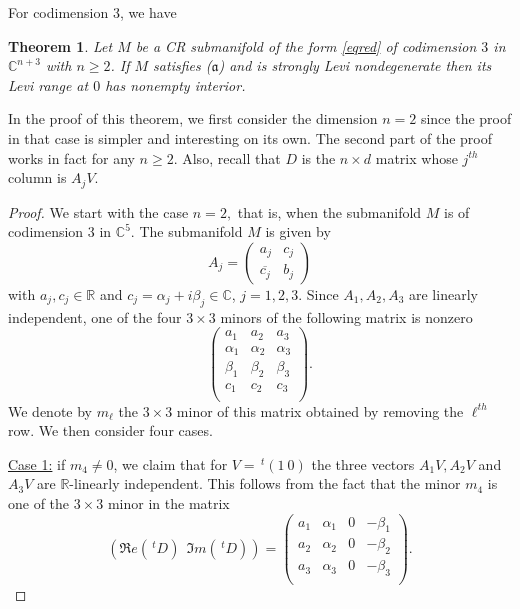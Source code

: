 \documentclass[12pt]{amsart}
\newcommand{\C}{\mathbb C}
\newcommand{\R}{\mathbb R}
\newcommand{\transp}{\,^t}
\newtheorem{theo}{Theorem}[section]
\theoremstyle{remark}
\theoremstyle{example}
\theoremstyle{definition}
\numberwithin{equation}{section}
\begin{document}
For codimension 3, we have  

\begin{theo}\label{theod=3}
Let $M$ be a CR submanifold of the form \eqref{eqred} of codimension $3$ in $\C^{n+3}$ with $n\geq 2$. If $M$ satisfies ($\mathfrak{a}$) and is strongly Levi nondegenerate then its Levi range at $0$ has nonempty interior. 
\end{theo}

In the proof of this theorem, we first consider the dimension  $n=2$ since the proof in that case is simpler and interesting on its own. The second part of the proof works in fact for any $n \geq 2$. Also, recall that $D$ is the $n\times d$ matrix whose $j^{th}$ column is $A_jV$.
    
\begin{proof} 
We start with the case  $n=2,$ that is, when the submanifold  $M$ is of codimension 3 in $\C^5$. The submanifold $M$ is given by 
$$A_j=\begin{pmatrix}a_j & c_j \\ \overline{c_j} & b_j \end{pmatrix}$$
with $a_j,c_j \in \R$ and $c_j=\alpha_j+i\beta_j \in \C$, $j=1,2,3$. Since $A_1,A_2,A_3$ are linearly independent, one of the four $3\times 3$ minors of the following matrix is nonzero
$$\begin{pmatrix}
a_1 & a_2 & a_3 \\ 
\alpha_1 & \alpha_2 & \alpha_3 \\ 
\beta_1 & \beta_2 & \beta_3 \\ 
c_1 & c_2 & c_3 \\ 
 \end{pmatrix}.$$
We denote by $m_\ell$ the $3\times 3$ minor of this matrix obtained by removing the $\ell^{th}$ row. We then consider four cases. 

\noindent \underline{Case 1:} if $m_4\neq 0$, we claim that for $V=\transp (1 \  0)$ the three vectors $A_1V,A_2V$ and $A_3V$ are $\R$-linearly independent. This follows from the fact that the 
minor $m_4$ is one of the $3\times 3$ minor in the matrix 
$$(\Re e (\transp D) \ \ \Im m  (\transp D))=\begin{pmatrix} 
a_1 & \alpha_1 & 0    & -\beta_1 \\ 
a_2 & \alpha_2 & 0   &-\beta_2  \\ 
a_3 & \alpha_3 & 0    & -\beta_3\\ 

\end{pmatrix}.$$  
  

\end{proof}
\end{document}
